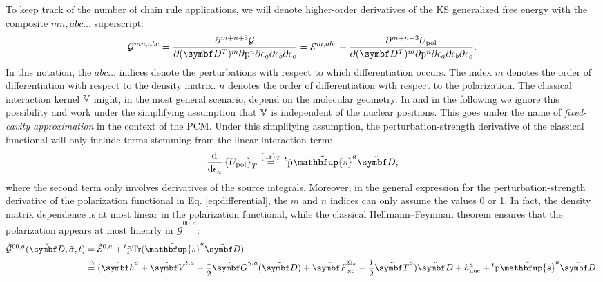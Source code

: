 To keep track of the number of chain rule applications,
we will denote higher-order derivatives of the \acrshort{KS}
generalized free energy with the composite ${mn, abc\ldots}$
superscript:
\begin{equation}\label{eq:differential}
  \mathcal{G}^{mn, abc}
  =
  \frac{\partial^{m+n+3}\mathcal{G}}{\partial(\mat{D}^T)^m\partial\p^n\partial\epsilon_a\partial\epsilon_b\partial\epsilon_c}
  =
    \mathcal{E}^{m, abc} +
  \frac{\partial^{m+n+3}U_\mathrm{pol}}{\partial(\mat{D}^T)^m\partial\p^n\partial\epsilon_a\partial\epsilon_b\partial\epsilon_c} \text{.}
\end{equation}
In this notation, the $abc\ldots$ indices denote the perturbations with
respect to which differentiation occurs. The index $m$ denotes the order
of differentiation with respect to the density matrix. $n$
denotes the order of differentiation with respect to the
polarization.
The classical interaction kernel $\mathbb{V}$ might, in the most general
scenario, depend on the molecular geometry.
In  and in the following we ignore this possibility and work
under the simplifying assumption that $\mathbb{V}$ is independent of the nuclear
positions.
This goes under the name of \emph{fixed-cavity approximation} in the
context of the \acrshort{PCM}.\autocite{Cammi1994-qj}
Under this simplifying assumption, the perturbation-strength derivative
of the classical functional will only include terms stemming from the
linear interaction term:
\begin{equation}\label{eq:polarization-derivative}
 \deriv{}{\epsilon_a}\left\lbrace
 U_\mathrm{pol}
 \right\rbrace_T
 \eqavetr
 {}^t\tilde{\p}\tilde{\mathbfup{s}}^a\pertmat{D} \text{,}
\end{equation}
where the second term only involves derivatives of the source integrals.
Moreover, in the general expression for the perturbation-strength
derivative of the polarization functional in Eq. \eqref{eq:differential},
the $m$ and $n$ indices can only assume the values 0 or 1.
In fact, the density matrix dependence is at most linear in the
polarization functional, while the classical Hellmann--Feynman theorem
ensures that the polarization appears at most linearly in $\tilde{\mathcal{G}}^{00,a}$:
\begin{equation}\label{eq:tilde-G00-a}
  \begin{aligned}
    \tilde{\mathcal{G}}^{00,a}(\tilde{\mat{D}}, \tilde{\sigma}, t)
    &= \tilde{\mathcal{E}}^{0,a} +
    {}^t\tilde{\p}\Tr({\tilde{\mathbfup{s}}^a\pertmat{D}}) \\
  &\eqtr
  (\pertmat{h}^a + \pertmat{V}^{t,a} + \frac{1}{2}\pertmat{G}^{\gamma, a}(\pertmat{D}) + \pertmat{F}^{\Omega_a}_\mathrm{xc}
  -\frac{\mathrm{i}}{2}\pertmat{T}^a)\pertmat{D}
  + h_\mathrm{nuc}^a + {}^t\tilde{\p}\tilde{\mathbfup{s}}^a\pertmat{D}.
  \end{aligned}
\end{equation}
